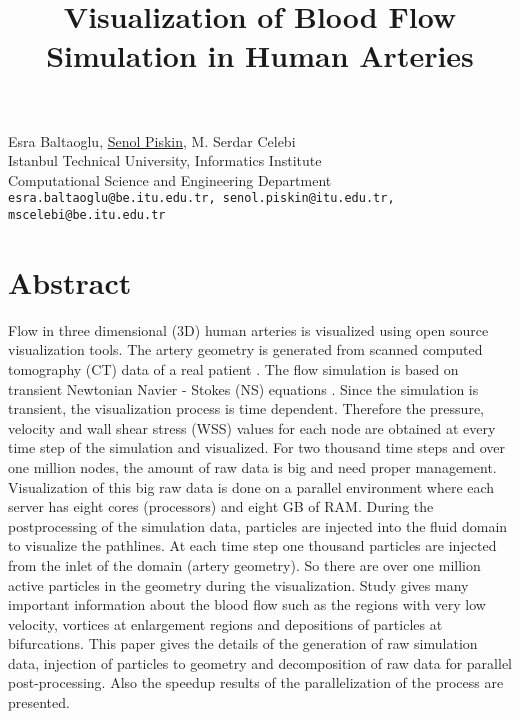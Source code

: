 \title{Visualization of Blood Flow Simulation in Human Arteries}
\author{} \institute{}
\maketitle

\begin{center}
{\large Esra Baltaoglu, \underline{Senol Piskin}, M. Serdar Celebi}\\
Istanbul Technical University, Informatics Institute\\
Computational Science and Engineering Department\\
{\tt esra.baltaoglu@be.itu.edu.tr, senol.piskin@itu.edu.tr, mscelebi@be.itu.edu.tr}
\end{center}

\section*{Abstract}
Flow in three dimensional (3D) human arteries is visualized using open source visualization tools. The artery geometry is generated from scanned computed tomography (CT) data of a real patient \cite{fsi2009,biomed}. The flow simulation is based on transient Newtonian Navier - Stokes (NS) equations \cite{cfd2010}. Since the simulation is transient, the visualization process is time dependent. Therefore the pressure, velocity and wall shear stress (WSS) values for each node are obtained at every time step of the simulation and visualized. For two thousand time steps and over one million nodes, the amount of raw data is big and need proper management. Visualization of this big raw data is done on a parallel environment where each server has eight cores (processors) and eight GB of RAM. During the postprocessing of the simulation data, particles are injected into the fluid domain to visualize the pathlines. At each time step one thousand particles are injected from the inlet of the domain (artery geometry). So there are over one million active particles in the geometry during the visualization. Study gives many important information about the blood flow such as the regions with very low velocity, vortices at enlargement regions and depositions of particles at bifurcations. This paper 
gives the details of the generation of raw simulation data, injection of particles to geometry and decomposition of raw data for parallel post-processing. Also the speedup results of the parallelization of the process are presented.

